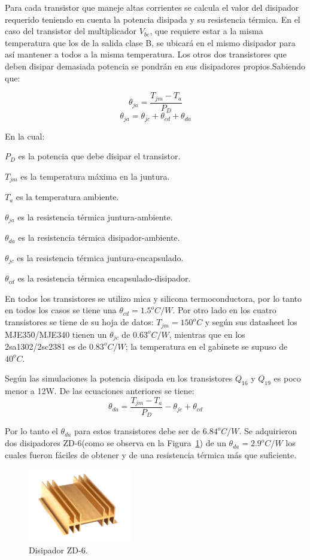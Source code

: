 Para cada transistor que maneje altas corrientes se calcula el valor del disipador requerido teniendo en cuenta la potencia disipada y su resistencia térmica. En el caso del transistor del multiplicador $V_{be}$, que requiere estar a la misma temperatura que los de la salida clase B, se ubicará en el mismo disipador para así mantener a todos a la misma temperatura. Los otros dos transistores que deben disipar demasiada potencia se pondrán en sus disipadores propios.Sabiendo que:

$$
   \theta_{ja}=\dfrac{T_{jm}-T_a}{P_D}
$$
$$
	\theta_{ja}=\theta_{jc}+\theta_{cd}+\theta_{da}
$$

En la cual:
\begin{list}{ }
\item $P_D$  es la potencia que debe disipar el transistor.
\item $T_{jm}$ es la temperatura máxima en la juntura.
\item  $T_a$ es la temperatura ambiente.
\item  $\theta_{ja}$ es la resistencia térmica juntura-ambiente.
\item  $\theta_{da}$ es la resistencia térmica disipador-ambiente.
\item  $\theta_{jc}$ es la resistencia térmica juntura-encapsulado.
\item  $\theta_{cd}$ es la resistencia térmica encapsulado-disipador.
\end{list}
En todos los transistores se utilizo mica y silicona termoconductora, por lo tanto en todos los casos se tiene una $\theta_{cd}=1.5^oC/W$.
Por otro lado en los cuatro transistores se tiene de su hoja de datos: $T_{jm}=150^oC$ y según sus datasheet los MJE350/MJE340 tienen un $\theta_{jc}$ de $0.63^oC/W$, mientras que en los 2sa1302/2sc2381 es de $0.83^oC/W$; la temperatura en el gabinete se supuso de $40^oC$.

Según las simulaciones la potencia disipada en los transistores $Q_{16}$ y $Q_{19}$ es poco menor a 12W. De las ecuaciones anteriores se tiene:
$$
	\theta_{da}=\dfrac{T_{jm}-T_a}{P_D} - \theta_{jc}+\theta_{cd}
$$

Por lo tanto el $\theta_{da}$ para estos transistores debe ser de $6.84^oC/W$. Se adquirieron dos disipadores ZD-6(como se observa en la Figura~\ref{zd6}) de un  $\theta_{da}=2.9^oC/W$ los cuales fueron fáciles de obtener y de una resistencia térmica más que suficiente.

\begin{figure}[H]
\centerline{
\includegraphics[width=0.4\textwidth]{img/zd-6.jpg}}
\caption{Disipador ZD-6.}
\label{zd6} 
\end{figure}

